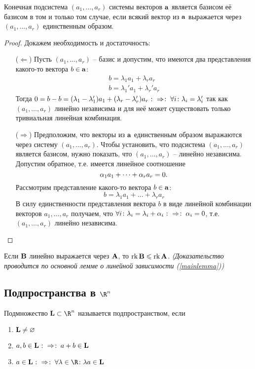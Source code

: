 \begin{theorem}
  Конечная подсистема $(a_1,\dots, a_r)$ системы векторов $\mathbf{a}$ является базисом её базисом в том и только том случае, если всякий вектор из $\mathbf{a}$ выражается через $(a_1,\dots, a_r)$ единственным образом.
\end{theorem}
\begin{proof}
  Докажем необходимость и достаточность:
  \begin{itemize}
    \item[($\Leftarrow$)]  Пусть $(a_1,\dots, a_r)$ -- базис и допустим, что имеются два представления какого-то вектора $b\in\mathbf{a}$:
    \begin{gather*}
     b=\lambda_1a_1+\lambda_ra_r\\
     b=\lambda_1'a_1+\lambda_r'a_r
    \end{gather*}
    Тогда $0=b-b=(\lambda_1-\lambda_1')a_1+(\lambda_r-\lambda_r')a_r\mathbin{\colon\Rightarrow \colon}\forall i\colon\lambda_i=\lambda_i'$ так как $(a_1,\dots, a_r)$ линейно независима и для неё может существовать только тривиальная линейная комбинация.
    
    \item[($\Rightarrow$)] Предположим, что векторы из $\mathbf{a}$ единственным образом выражаются через систему $(a_1,\dots, a_r)$. Чтобы установить, что подсистема $(a_1,\dots, a_r)$ является базисом, нужно показать, что $(a_1,\dots, a_r)$ -- линейно независима. Допустим обратное, т.е. имеется линейное соотношение
    $$\alpha_1a_1+\dots+\alpha_ra_r=0.$$
    Рассмотрим представление какого-то вектора $b\in\mathbf{a}$:
    $$b=\lambda_1a_1+\dots+\lambda_ra_r$$
    В силу единственности представления вектора $b$ в виде линейной комбинации векторов $a_1,\dots, a_r$ получаем, что $\forall i\colon\lambda_i=\lambda_i+\alpha_i\mathbin{\colon\Rightarrow \colon} \alpha_i=0$, т.е. $(a_1,\dots, a_r)$ линейно независима.
  \end{itemize}
\end{proof}

\begin{stm}
  Если $\mathbf{B}$ линейно выражается через $\mathbf{A}$, то $\operatorname{rk} \mathbf{B}\leqslant\operatorname{rk}\mathbf{A}$. \emph{(Доказательство проводится по основной лемме о линейной зависимости (\ref{mainlemma}))}
\end{stm}

\subsection{Подпространства в $\R^n$}

\begin{df}
  Подмножество $\Lb\subset \R^n$ называется подпространством, если
  \begin{enumerate}
    \item $\mathbf{L}\ne\varnothing$
    \item $a,b\in\mathbf{L}\mathbin{\colon\Rightarrow \colon} a+b\in\mathbf{L}$
    \item $a\in\Lb\ra \forall\lambda\in\R\spc\lambda a\in\Lb$
  \end{enumerate}
\end{df}

